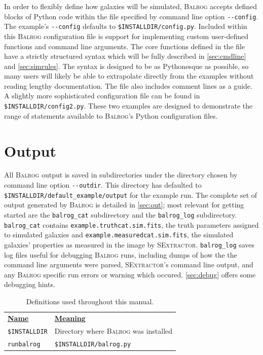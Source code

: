 \documentclass[12pt]{book}
\newcommand{\py}{Python}
\newcommand{\balrog}{\textsc{Balrog}}
\newcommand{\sex}{\textsc{SExtractor}}
\newcommand{\opt}[1]{{\texttt{-}\texttt{-#1}}}
\newcommand\note[3]{\todo[color=#1, inline, size=\small]{#2: #3}}
\newcommand\notesuchyta[1]{\note{red!50}{EDS}{#1}}
\begin{document}
In order to flexibly define how galaxies will be simulated, \balrog{} accepts defined blocks of \py{} code
within the file specified by command line option \opt{config}.
The example's \opt{config} defaults to \texttt{\$INSTALLDIR/config.py}.
Included within this \balrog{} configuration file is support for implementing custom user-defined functions 
and command line arguments.
The core functions defined in the file have a strictly
structured syntax which will be fully described in \autoref{sec:cmdline} and \autoref{sec:simrules}. The syntax is designed to be as \py esque as possible, so
many users will likely be able to extrapolate directly from the examples without reading lengthy documentation. The file also
includes comment lines as a guide. A slightly more sophisticated configuration file can be found in \texttt{\$INSTALLDIR/config2.py}.
These two examples are designed to demonstrate the range of statements available to \balrog{}'s \py{} configuration files.


\section{Output}
\label{sec:output}

\notesuchyta{I might expand this section.}

All \balrog{} output is saved in subdirectories under the directory chosen by command line option \opt{outdir}.
This directory has defaulted to \texttt{\$INSTALLDIR/default\_example/output} for the example run.
The complete set of output generated by \balrog{} is detailed in \autoref{sec:out};
most relevant for getting started are the \texttt{balrog\_cat} subdirectory and the \texttt{balrog\_log} subdirectory.
\texttt{balrog\_cat} contains \texttt{example.truthcat.sim.fits}, the truth parameters assigned to simulated galaxies
and \texttt{example.measuredcat.sim.fits}, the simulated galaxies' properties as measured in the image by \sex{}.
\texttt{balrog\_log} saves log files useful for debugging \balrog{} runs, including dumps of how the the command line
arguments were parsed, \sex{}'s command line output, and any \balrog{} specific run errors or warning which occured.
\autoref{sec:debug} offers some debugging hints.


\begin{table}[h]
\caption{Definitions used throughout this manual.}
\label{tab:def}
\begin{tabular}{l l}
\underline{\textbf{Name}} & \underline{\textbf{Meaning}} \\
\texttt{\$INSTALLDIR} & Directory where \balrog{} was installed \\
\texttt{runbalrog} & \texttt{\$INSTALLDIR/balrog.py} \\
\end{tabular}
\end{table}
\end{document}
